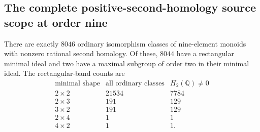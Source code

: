 \subsection{The complete positive-second-homology source scope at order nine}

\begin{proposition}
\label{CP2:A-positive-corners-nine}
There are exactly $8046$ ordinary isomorphism classes of
nine-element monoids with nonzero rational second homology.
Of these, $8044$ have a rectangular minimal ideal and two
have a maximal subgroup of order two in their minimal ideal.
The rectangular-band counts are
\[
\begin{array}{c|r|r}
\text{minimal shape}&\text{all ordinary classes}&H_2(\mathbb Q)\ne0\\\hline
2\times2&21534&7784\\
2\times3&191&129\\
3\times2&191&129\\
2\times4&1&1\\
4\times2&1&1.
\end{array}
\]
\end{proposition}
